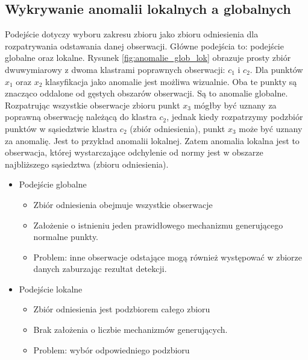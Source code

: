 \subsection{Wykrywanie anomalii lokalnych a globalnych}
\label{sub:loc_glob}
Podejście dotyczy wyboru zakresu zbioru jako zbioru odniesienia dla rozpatrywania odstawania danej obserwacji. Główne podejścia to: podejście globalne oraz lokalne. Rysunek \ref{fig:anomalie_glob_lok} obrazuje prosty zbiór dwuwymiarowy z dwoma klastrami poprawnych obserwacji: $c_1$ i $c_2$. Dla punktów $x_1 $ oraz $x_2$ klasyfikacja jako anomalie jest możliwa wizualnie. Oba te punkty są znacząco oddalone od gęstych obszarów obserwacji. Są to anomalie globalne. Rozpatrując wszystkie obserwacje zbioru punkt $x_3$ mógłby być uznany za poprawną obserwację należącą do klastra $c_2$, jednak kiedy rozpatrzymy podzbiór punktów w sąsiedztwie klastra $c_2$ (zbiór odniesienia), punkt $x_3$ może być uznany za anomalię. Jest to przykład anomalii lokalnej. Zatem anomalia lokalna jest to obserwacja, której wystarczające odchylenie od normy jest w obszarze najbliższego sąsiedztwa (zbioru odniesienia). 
\begin{itemize}
    \item Podejście globalne 
    \begin{itemize}
        \item Zbiór odniesienia obejmuje wszystkie obserwacje
        \item Założenie o istnieniu jeden prawidłowego mechanizmu generującego normalne punkty.
        \item Problem: inne obserwacje odstające mogą również występować w zbiorze danych zaburzając rezultat detekcji.
    \end{itemize}
    \item Podejście lokalne 
    \begin{itemize}
        \item Zbiór odniesienia jest podzbiorem całego zbioru
        \item Brak założenia o liczbie mechanizmów generujących.
        \item Problem: wybór odpowiedniego podzbioru
    \end{itemize}
\end{itemize}


